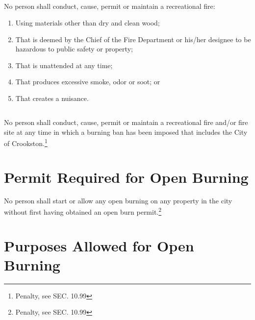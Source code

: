 \subsection{}
No person shall conduct, cause, permit or maintain a recreational fire:
\begin{enumerate}[{\indent}1)]
    \item Using materials other than dry and clean wood;
    \item That is deemed by the Chief of the Fire Department or his/her designee to be hazardous to public safety or property;
    \item That is unattended at any time;
    \item That produces excessive smoke, odor or soot; or
    \item That creates a nuisance.
\end{enumerate}
\subsection{}
No person shall conduct, cause, permit or maintain a recreational fire and/or fire site at any time in which a burning ban has been imposed that includes the City of Crookston.\footnote{Penalty, see SEC. 10.99}

\section{Permit Required for Open Burning}
No person shall start or allow any open burning on any property in the city without first having obtained an open burn permit.\footnote{Penalty, see SEC. 10.99}

\section{Purposes Allowed for Open Burning}
